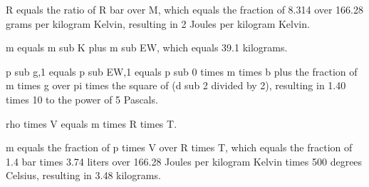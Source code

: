 R equals the ratio of R bar over M, which equals the fraction of 8.314 over 166.28 grams per kilogram Kelvin, resulting in 2 Joules per kilogram Kelvin.

m equals m sub K plus m sub EW, which equals 39.1 kilograms.

p sub g,1 equals p sub EW,1 equals p sub 0 times m times b plus the fraction of m times g over pi times the square of (d sub 2 divided by 2), resulting in 1.40 times 10 to the power of 5 Pascals.

rho times V equals m times R times T.

m equals the fraction of p times V over R times T, which equals the fraction of 1.4 bar times 3.74 liters over 166.28 Joules per kilogram Kelvin times 500 degrees Celsius, resulting in 3.48 kilograms.